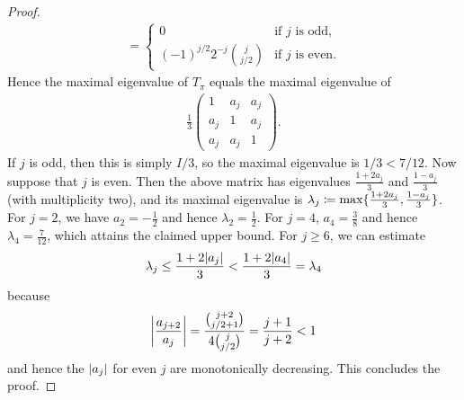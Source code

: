 \documentclass[11pt,a4paper]{article}
\numberwithin{equation}{section}
\newcommand{\1}{\mathbf{1}}
\DeclarePairedDelimiter\abs{\lvert}{\rvert}
\DeclarePairedDelimiter\braces{\lbrace}{\rbrace}
\begin{document}
\begin{proof}
\begin{align*}
    = \begin{cases}
        0 & \text{if $j$ is odd}, \\
        (-1)^{j/2} 2^{-j} \binom j {j/2} & \text{if $j$ is even}.
        \end{cases}
    \end{align*}
    Hence the maximal eigenvalue of $T_\pi$ equals the maximal eigenvalue of
    \begin{align*}
        \frac13 \begin{pmatrix}
        1 & a_j & a_j \\
        a_j & 1 & a_j \\
        a_j & a_j & 1
        \end{pmatrix}.
    \end{align*}
    If $j$ is odd, then this is simply $I/3$, so the maximal eigenvalue is $1/3 < 7/12$.
    Now suppose that $j$ is even.
    Then the above matrix has eigenvalues $\frac{1 + 2a_j}3$ and $\frac{1-a_j}3$ (with multiplicity two), and its maximal eigenvalue is
    $\lambda_j \coloneqq \max \braces{ \frac{1 + 2a_j}3, \frac{1 - a_j}3 }$.
    For $j=2$, we have $a_2 = -\frac12$ and hence $\lambda_2 = \frac12$.
    For $j=4$, $a_4 = \frac38$ and hence $\lambda_4 = \frac7{12}$, which attains the claimed upper bound.
    For $j\geq6$, we can estimate
    \begin{align*}
        \lambda_j \leq \frac{1 + 2\abs{a_j}}3 < \frac{1 + 2 \abs{a_4}}3 = \lambda_4
    \end{align*}
    because
    \begin{align*}
        \abs*{\frac {a_{j+2}} {a_j}}
    = \frac {\binom{j+2} {j/2+1}} {4 \binom j {j/2}}
    = \frac {j+1}{j+2} < 1
    \end{align*}
    and hence the $\abs{a_j}$ for even $j$ are monotonically decreasing.
    This concludes the proof.
\end{proof}

\end{document}

